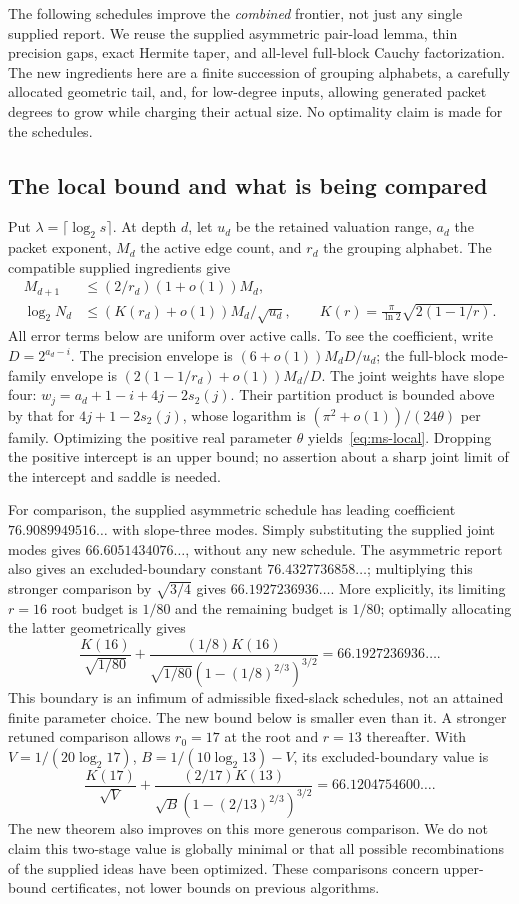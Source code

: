 The following schedules improve the \emph{combined} frontier, not just any
single supplied report. We reuse the supplied asymmetric pair-load lemma,
thin precision gaps, exact Hermite taper, and all-level full-block Cauchy
factorization. The new ingredients here are a finite succession of grouping
alphabets, a carefully allocated geometric tail, and, for low-degree inputs,
allowing generated packet degrees to grow while charging their actual size.
No optimality claim is made for the schedules.

\subsection{The local bound and what is being compared}
Put $\lambda=\lceil\log_2s\rceil$. At depth $d$, let $u_d$ be the retained
valuation range, $a_d$ the packet exponent, $M_d$ the active edge count, and
$r_d$ the grouping alphabet. The compatible supplied ingredients give
\begin{align}
 M_{d+1}&\le (2/r_d)(1+o(1))M_d,\label{eq:ms-child}\\
 \log_2 N_d&\le (K(r_d)+o(1))M_d/\sqrt{u_d},\qquad
 K(r)=\frac{\pi}{\ln2}\sqrt{2(1-1/r)}.\label{eq:ms-local}
\end{align}
All error terms below are uniform over active calls. To see the coefficient,
write $D=2^{a_d-i}$. The precision envelope is $(6+o(1))M_dD/u_d$;
the full-block mode-family envelope is
$(2(1-1/r_d)+o(1))M_d/D$. The joint weights have slope four:
$w_j=a_d+1-i+4j-2s_2(j)$. Their partition product is bounded above by
that for $4j+1-2s_2(j)$, whose logarithm is
$(\pi^2+o(1))/(24\theta)$ per family. Optimizing the positive real
parameter $\theta$ yields~\eqref{eq:ms-local}. Dropping the positive
intercept is an upper bound; no assertion about a sharp joint limit of the
intercept and saddle is needed.

For comparison, the supplied asymmetric schedule has leading coefficient
$76.9089949516\ldots$ with slope-three modes. Simply substituting the
supplied joint modes gives $66.6051434076\ldots$, without any new schedule.
The asymmetric report also gives an excluded-boundary constant
$76.4327736858\ldots$; multiplying this stronger comparison by
$\sqrt{3/4}$ gives $66.1927236936\ldots$. More explicitly, its limiting
$r=16$ root budget is $1/80$ and the remaining budget is $1/80$; optimally
allocating the latter geometrically gives
\[
 \frac{K(16)}{\sqrt{1/80}}+
 \frac{(1/8)K(16)}{\sqrt{1/80}(1-(1/8)^{2/3})^{3/2}}
 =66.1927236936\ldots.
\]
This boundary is an infimum of admissible fixed-slack schedules, not an
attained finite parameter choice. The new bound below is smaller even
than it. A stronger retuned comparison allows $r_0=17$ at the root and $r=13$
thereafter. With $V=1/(20\log_2 17)$, $B=1/(10\log_2 13)-V$, its
excluded-boundary value is
\[
 \frac{K(17)}{\sqrt V}+
 \frac{(2/17)K(13)}{\sqrt B(1-(2/13)^{2/3})^{3/2}}
 =66.1204754600\ldots.
\]
The new theorem also improves on this more generous comparison. We do not
claim this two-stage value is globally minimal or that all possible
recombinations of the supplied ideas have been optimized.
These comparisons concern upper-bound certificates, not lower bounds on
previous algorithms.

